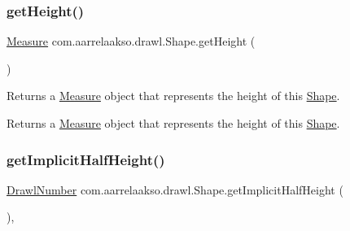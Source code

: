 \subsubsection{\texorpdfstring{get\+Height()}{getHeight()}}
{\footnotesize\ttfamily \hyperlink{classcom_1_1aarrelaakso_1_1drawl_1_1_measure}{Measure} com.\+aarrelaakso.\+drawl.\+Shape.\+get\+Height (\begin{DoxyParamCaption}{ }\end{DoxyParamCaption})\hspace{0.3cm}{\ttfamily [inherited]}}



Returns a \hyperlink{classcom_1_1aarrelaakso_1_1drawl_1_1_measure}{Measure} object that represents the height of this \hyperlink{classcom_1_1aarrelaakso_1_1drawl_1_1_shape}{Shape}. 

\begin{DoxyReturn}{Returns}
a \hyperlink{classcom_1_1aarrelaakso_1_1drawl_1_1_measure}{Measure} object that represents the height of this \hyperlink{classcom_1_1aarrelaakso_1_1drawl_1_1_shape}{Shape}. 
\end{DoxyReturn}
\mbox{\label{classcom_1_1aarrelaakso_1_1drawl_1_1_shape_aa476150489a3a5b634a15a1c03e045d7}} 
\subsubsection{\texorpdfstring{get\+Implicit\+Half\+Height()}{getImplicitHalfHeight()}}
{\footnotesize\ttfamily \hyperlink{classcom_1_1aarrelaakso_1_1drawl_1_1_drawl_number}{Drawl\+Number} com.\+aarrelaakso.\+drawl.\+Shape.\+get\+Implicit\+Half\+Height (\begin{DoxyParamCaption}{ }\end{DoxyParamCaption})\hspace{0.3cm}{\ttfamily [protected]}, {\ttfamily [inherited]}}

\mbox{\label{classcom_1_1aarrelaakso_1_1drawl_1_1_shape_ac796f934debb4cf92d285f387422deb6}} 
